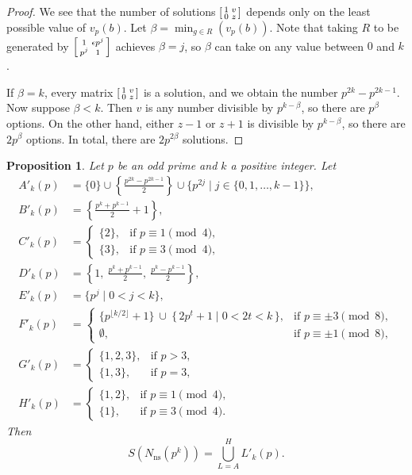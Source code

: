 \documentclass[10pt,leqno]{amsart}
\newcommand\sm[1]{\begin{bsmallmatrix}#1\end{bsmallmatrix}}
\newtheorem{proposition}[theorem]{Proposition}
\theoremstyle{definition}
\theoremstyle{remark}
\numberwithin{theorem}{section}
\begin{document}
\begin{proof}
We see that the number of solutions $\sm{1 & v \\0 & z}$ depends only on the least possible value of $v_p(b)$. Let $\beta=\min_{g \in R}(v_p(b))$. Note that taking $R$ to be generated by $\sm{1 & \epsilon p^j \\ p^j & 1}$ achieves $\beta=j$, so $\beta$ can take on any value between $0$ and $k$. 

If $\beta=k$, every matrix $\sm{1 & v \\0 & z}$ is a solution, and we obtain the number $p^{2k}-p^{2k-1}$. Now suppose $\beta<k$. Then $v$ is any number divisible by $p^{k-\beta}$, so there are $p^\beta$ options. On the other hand, either $z-1$ or $z+1$ is divisible by $p^{k-\beta}$, so there are $2p^{\beta}$ options. In total, there are $2p^{2\beta}$ solutions.
\end{proof}

\begin{proposition}
     Let $p$ be an odd prime and $k$ a positive integer.  Let $$
\begin{aligned}
A'_k(p)&=\{0\} \cup \left\{ \frac{p^{2k}-p^{2k-1}}{2} \right\}\cup \{p^{2j} \mid j\in \{0,1,\ldots,k-1\}\},\\
B'_k(p)&=\left\{\frac{p^k+p^{k-1}}{2}+1\right\},\\
C'_k(p)&=\begin{cases}
\{2\}, & \text{if } p\equiv 1\pmod{4},\\[4pt]
\{3\}, & \text{if } p\equiv 3\pmod{4},
\end{cases}\\
D'_k(p)&=\left\{1,\ \frac{p^k+p^{k-1}}{2},\ \frac{p^k-p^{k-1}}{2}\right\},\\
E'_k(p)&=\{p^j \mid 0<j<k\},\\
F'_k(p)&=\begin{cases}
\{p^{\lfloor k/2 \rfloor}+1\}\ \cup\ \{\,2p^t+1 \mid 0<2t<k\,\}, & \text{if } p\equiv \pm 3 \pmod 8,\\[4pt]
\emptyset, & \text{if } p\equiv \pm 1 \pmod 8,
\end{cases}\\
G'_k(p)&=\begin{cases}
\{1,2,3\}, & \text{if } p>3,\\[4pt]
\{1,3\}, & \text{if } p=3,
\end{cases}\\
H'_k(p)&=\begin{cases}
\{1,2\}, & \text{if } p\equiv 1\pmod{4},\\[4pt]
\{1\}, & \text{if } p\equiv 3\pmod{4}.
\end{cases}
\end{aligned}
$$ Then 
    $$S(N_{\mathrm{ns}}(p^k))=\bigcup_{L=A}^H L'_k(p).$$
\end{proposition}
\end{document}
